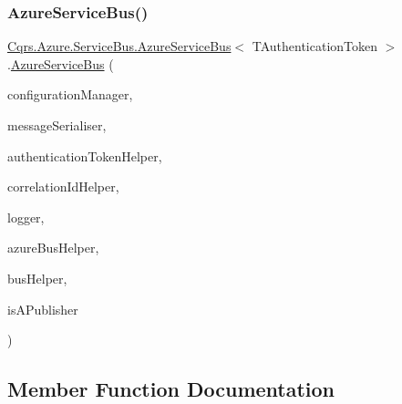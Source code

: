 \subsubsection{\texorpdfstring{Azure\+Service\+Bus()}{AzureServiceBus()}}
{\footnotesize\ttfamily \hyperlink{classCqrs_1_1Azure_1_1ServiceBus_1_1AzureServiceBus}{Cqrs.\+Azure.\+Service\+Bus.\+Azure\+Service\+Bus}$<$ T\+Authentication\+Token $>$.\hyperlink{classCqrs_1_1Azure_1_1ServiceBus_1_1AzureServiceBus}{Azure\+Service\+Bus} (\begin{DoxyParamCaption}\item[{\hyperlink{interfaceCqrs_1_1Configuration_1_1IConfigurationManager}{I\+Configuration\+Manager}}]{configuration\+Manager,  }\item[{\hyperlink{interfaceCqrs_1_1Azure_1_1ServiceBus_1_1IMessageSerialiser}{I\+Message\+Serialiser}$<$ T\+Authentication\+Token $>$}]{message\+Serialiser,  }\item[{\hyperlink{interfaceCqrs_1_1Authentication_1_1IAuthenticationTokenHelper}{I\+Authentication\+Token\+Helper}$<$ T\+Authentication\+Token $>$}]{authentication\+Token\+Helper,  }\item[{I\+Correlation\+Id\+Helper}]{correlation\+Id\+Helper,  }\item[{I\+Logger}]{logger,  }\item[{\hyperlink{interfaceCqrs_1_1Azure_1_1ServiceBus_1_1IAzureBusHelper}{I\+Azure\+Bus\+Helper}$<$ T\+Authentication\+Token $>$}]{azure\+Bus\+Helper,  }\item[{\hyperlink{interfaceCqrs_1_1Bus_1_1IBusHelper}{I\+Bus\+Helper}}]{bus\+Helper,  }\item[{bool}]{is\+A\+Publisher }\end{DoxyParamCaption})\hspace{0.3cm}{\ttfamily [protected]}}



\subsection{Member Function Documentation}
\mbox{\label{classCqrs_1_1Azure_1_1ServiceBus_1_1AzureServiceBus_a6ea94560e02fce0d920c467062f5fc98}} 
